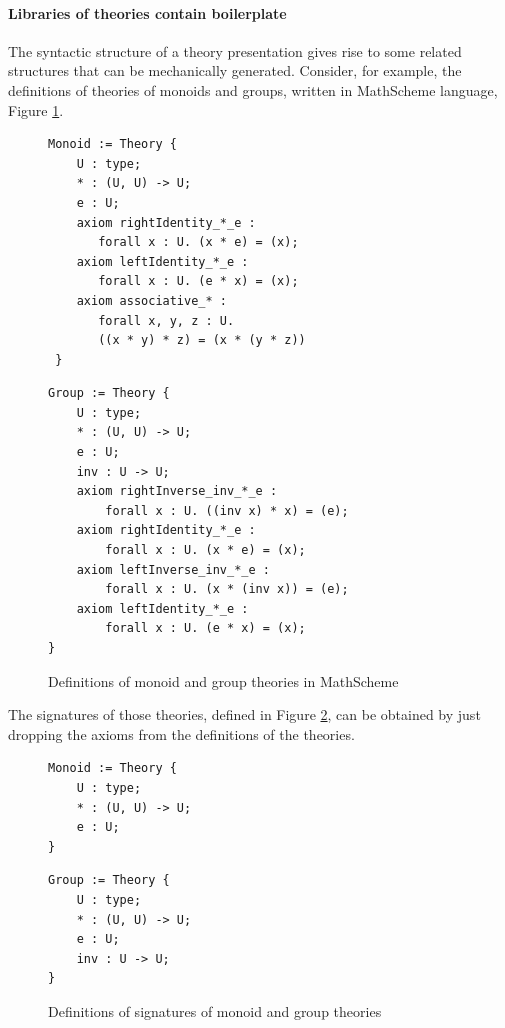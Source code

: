  \paragraph{Libraries of theories contain boilerplate} The syntactic structure of a theory 
 presentation gives rise to some related structures that can be mechanically generated. Consider, for 
 example, the definitions of theories of monoids and groups, written in MathScheme language, 
 Figure 
 \ref{fig:theories}. 
\begin{figure}[h]
	\begin{minipage}[t]{0.5\textwidth}
		\begin{Verbatim}
Monoid := Theory {
    U : type;
    * : (U, U) -> U;
    e : U;
    axiom rightIdentity_*_e : 
       forall x : U. (x * e) = (x);
    axiom leftIdentity_*_e : 
       forall x : U. (e * x) = (x);
    axiom associative_* : 
       forall x, y, z : U. 
       ((x * y) * z) = (x * (y * z))
 } 
      \end{Verbatim}
	\end{minipage}%
	\begin{minipage}[t]{0.5\textwidth}
		\begin{Verbatim}
Group := Theory {
    U : type;
    * : (U, U) -> U;
    e : U;
    inv : U -> U;
    axiom rightInverse_inv_*_e : 
        forall x : U. ((inv x) * x) = (e);
    axiom rightIdentity_*_e : 
        forall x : U. (x * e) = (x);
    axiom leftInverse_inv_*_e : 
        forall x : U. (x * (inv x)) = (e);
    axiom leftIdentity_*_e : 
        forall x : U. (e * x) = (x);
} 
		\end{Verbatim}
	\end{minipage}%
	\caption{Definitions of monoid and group theories in MathScheme}
	\label{fig:theories}
\end{figure}
The signatures of those theories, defined in Figure \ref{fig:signatures}, can be obtained by just 
dropping the axioms from the definitions of the theories. 
\begin{figure}
	\begin{minipage}[t]{0.5\textwidth}
		\begin{verbatim}
Monoid := Theory {
    U : type;
    * : (U, U) -> U;
    e : U;
} 		
		\end{verbatim}
	\end{minipage}%
	\begin{minipage}[t]{0.5\textwidth}
		\begin{verbatim}
Group := Theory {
    U : type;
    * : (U, U) -> U;
    e : U;
    inv : U -> U;
} 
		\end{verbatim}
	\end{minipage}%
	\caption{Definitions of signatures of monoid and group theories}
	\label{fig:signatures}
\end{figure}

